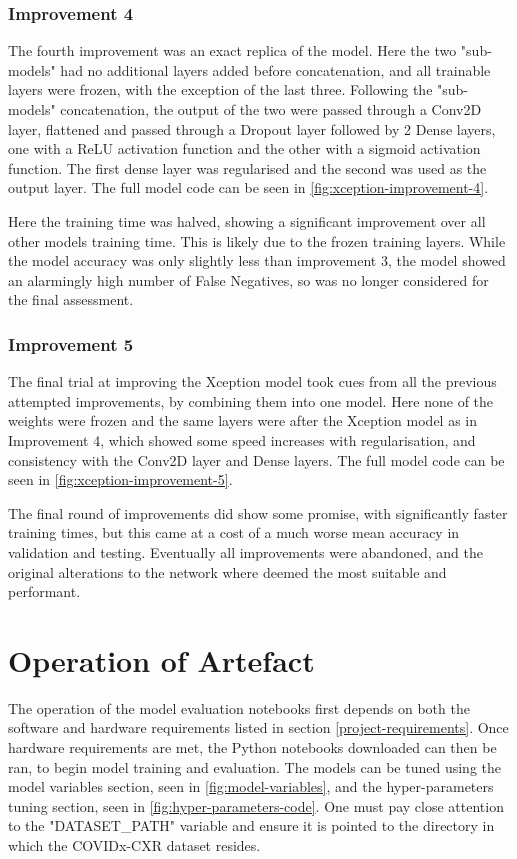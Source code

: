 \subsubsection{Improvement 4}
The fourth improvement was an exact replica of the \cite{fitriasari2021improvement} model. Here the two "sub-models" had no additional layers added before concatenation, and all trainable layers were frozen, with the exception of the last three. Following the "sub-models" concatenation, the output of the two were passed through a Conv2D layer, flattened and passed through a Dropout layer followed by 2 Dense layers, one with a ReLU activation function and the other with a sigmoid activation function. The first dense layer was regularised and the second was used as the output layer. The full model code can be seen in \autoref{fig:xception-improvement-4}.

Here the training time was halved, showing a significant improvement over all other models training time. This is likely due to the frozen training layers. While the model accuracy was only slightly less than improvement 3, the model showed an alarmingly high number of False Negatives, so was no longer considered for the final assessment.

\subsubsection{Improvement 5}
The final trial at improving the Xception model took cues from all the previous attempted improvements, by combining them into one model. Here none of the weights were frozen and the same layers were after the Xception model as in Improvement 4, which showed some speed increases with regularisation, and consistency with the Conv2D layer and Dense layers. The full model code can be seen in \autoref{fig:xception-improvement-5}.

The final round of improvements did show some promise, with significantly faster training times, but this came at a cost of a much worse mean accuracy in validation and testing. Eventually all improvements were abandoned, and the original alterations to the network where deemed the most suitable and performant.

\section{Operation of Artefact}
The operation of the model evaluation notebooks first depends on both the software and hardware requirements listed in section \ref{project-requirements}. Once hardware requirements are met, the Python notebooks downloaded can then be ran, to begin model training and evaluation. The models can be tuned using the model variables section, seen in \autoref{fig:model-variables}, and the hyper-parameters tuning section, seen in \autoref{fig:hyper-parameters-code}. One must pay close attention to the "DATASET\_PATH" variable and ensure it is pointed to the directory in which the COVIDx-CXR dataset resides.

